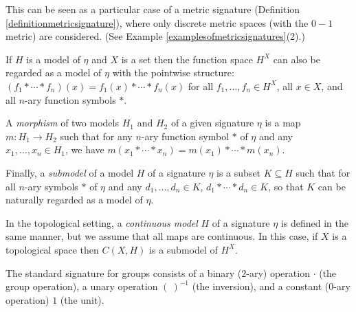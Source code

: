 This can be seen as a particular case of a metric signature (Definition \ref{definitionmetricsignature}), where only discrete metric spaces (with the $0-1$ metric) are considered. (See Example \ref{examplesofmetricsignatures}(2).)

If $H$ is a model of $\eta$ and $X$ is a set then the function space $H^X$ can also be regarded as a model of $\eta$ with the pointwise structure: $(f_1*\cdots*f_n)(x)=f_1(x)*\cdots*f_n(x)$ for all $f_1,\ldots,f_n\in H^X$, all $x\in X$, and all $n$-ary function symbols $\ast$.

A \emph{morphism} of two models $H_1$ and $H_2$ of a given signature $\eta$ is a map $m:H_1\to H_2$ such that for any $n$-ary function symbol $*$ of $\eta$ and any $x_1,\ldots,x_n\in H_1$, we have $m(x_1*\cdots*x_n)=m(x_1)*\cdots*m(x_n)$.

Finally, a \emph{submodel} of a model $H$ of a signature $\eta$ is a subset $K\subseteq H$ such that for all $n$-ary symbols $*$ of $\eta$ and any $d_1,\ldots,d_n\in K$, $d_1*\cdots*d_n\in K$, so that $K$ can be naturally regarded as a model of $\eta$.

In the topological setting, a \emph{continuous model} $H$ of a signature $\eta$ is defined in the same manner, but we assume that all maps are continuous. In this case, if $X$ is a topological space then $C(X,H)$ is a submodel of $H^X$.

\begin{example}
The standard signature for groups consists of a binary ($2$-ary) operation $\cdot$ (the group operation), a unary operation $(\ )^{-1}$ (the inversion), and a constant ($0$-ary operation) $1$ (the unit).
\end{example}


